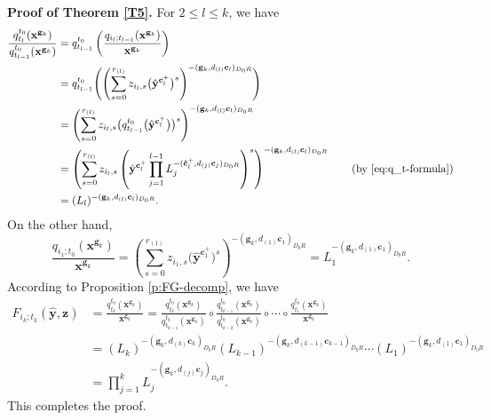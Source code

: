 \documentclass[10pt,a4paper]{amsart}
\numberwithin{equation}{section}
\begin{document}
{\bf Proof of Theorem \ref{T5}.}
For $2\leq l\leq k$, we have
\begin{align*}
 \frac{q_{t_{l}}^{t_0}(\mathbf{x}^{\mathbf{g}_k})}{q_{t_{l-1}}^{t_0}(\mathbf{x}^{\mathbf{g}_k})}
 &=q_{t_{l-1}}^{t_0}\left(\frac{q_{i_l;t_{l-1}}(\mathbf{x}^{\mathbf{g}_k})}{\mathbf{x}^{\mathbf{g}_k}}\right)\\
 &=q_{t_{l-1}}^{t_0}\Biggl(\left(\sum\limits_{s=0}^{r_{(l)}}z_{i_l,s}\bigl(\hat{\mathbf{y}}^{\mathbf{c}_{l}^+}\bigr)^s\right)^{-(\mathbf{g}_{k},d_{(l)}\mathbf{c}_{l})_{D_0R}}\Biggr)\\
 &=\left(\sum\limits_{s=0}^{r_{(l)}}z_{i_l,s}\bigl(q_{t_{l-1}}^{t_0}\bigl(\hat{\mathbf{y}}^{\mathbf{c}_{l}^+}\bigr)\bigr)^s\right)^{-(\mathbf{g}_{k},d_{(l)}\mathbf{c}_{l})_{D_0R}}\\
 &=\left(\sum\limits_{s=0}^{r_{(l)}}z_{i_l,s}\left(\hat{\mathbf{y}}^{\mathbf{c}_{l}^+}\prod\limits_{j=1}^{l-1}L_j^{-(\mathbf{\hat{c}}_{l}^+,d_{(j)}\mathbf{c}_{j})_{D_0R}}\right)^s\right)^{-(\mathbf{g}_{k},d_{(l)}\mathbf{c}_{l})_{D_0R}} \qquad (\text{by \eqref{eq:q_t-formula}})\\
 &=(L_l)^{-(\mathbf{g}_{k},d_{(l)}\mathbf{c}_{l})_{D_0R}}.
\end{align*}
On the other hand, \[\frac{q_{i_1;t_0}(\mathbf{x}^{\mathbf{g}_{k}})}{\mathbf{x}^{\mathbf{g}_{k}}}=\left(\sum\limits_{s=0}^{r_{(1)}}z_{i_1,s}\bigl(\hat{\mathbf{y}}^{\mathbf{c}_{1}^+}\bigr)^s\right)^{-(\mathbf{g}_{k},d_{(1)}\mathbf{c}_{1})_{D_0R}}=L_1^{-(\mathbf{g}_{k},d_{(1)}\mathbf{c}_{1})_{D_0R}}.\]
According to Proposition \ref{p:FG-decomp}, we have
\begin{align*}
 F_{i_k;t_k}(\hat{\mathbf{y}},\mathbf{z})&=\frac{q_{t_k}^{t_0}(\mathbf{x}^{\mathbf{g}_{k}})}{\mathbf{x}^{\mathbf{g}_k}}=\frac{q_{t_k}^{t_0}(\mathbf{x}^{\mathbf{g}_{k}})}{q_{t_{k-1}}^{t_0}(\mathbf{x}^{\mathbf{g}_{k}})}\circ\frac{q_{t_{k-1}}^{t_0}(\mathbf{x}^{\mathbf{g}_{k}})}{q_{t_{k-2}}^{t_0}(\mathbf{x}^{\mathbf{g}_{k}})}\circ\cdots\circ\frac{q_{t_1}^{t_0}(\mathbf{x}^{\mathbf{g}_{k}})}{\mathbf{x}^{\mathbf{g}_{k}}}\\
 &=(L_k)^{-(\mathbf{g}_{k},d_{(k)}\mathbf{c}_{k})_{D_0R}}(L_{k-1})^{-(\mathbf{g}_{k},d_{(k-1)}\mathbf{c}_{k-1})_{D_0R}}\cdots(L_1)^{-(\mathbf{g}_{k},d_{(1)}\mathbf{c}_{1})_{D_0R}}\\
 &=\prod\limits_{j=1}^{k}L_j^{-(\mathbf{g}_{k},d_{(j)}\mathbf{c}_{j})_{D_0R}}.
\end{align*}
This completes the proof. \hfill \qedsymbol
\end{document}
